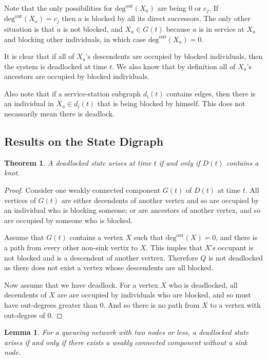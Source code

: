 \documentclass{article}
\newtheorem{theorem}{Theorem}
\newtheorem{lemma}{Lemma}
\begin{document}
Note that the only possibilities for $\text{deg}^{\text{out}}(X_a)$ are being 0 or $c_j$.
If $\text{deg}^{\text{out}}(X_a) = c_j$ then $a$ is blocked by all its direct successors.
The only other situation is that $a$ is not blocked, and $X_a \in G(t)$ because $a$ is in service at $X_a$ and blocking other individuals, in which case $\text{deg}^{\text{out}}(X_a) = 0$.

It is clear that if all of $X_a$'s descendents are occupied by blocked individuals, then the system is deadlocked at time $t$.
We also know that by definition all of $X_a$'s ancestors are occupied by blocked individuals.

Also note that if a service-station subgraph $d_i(t)$ contains edges, then there is an individual in $X_a \in d_i(t)$ that is being blocked by himself.
This does not necassarily mean there is deadlock.


\subsection{Results on the State Digraph}

\begin{theorem}
A deadlocked state arises at time $t$ if and only if $D(t)$ contains a knot.
\end{theorem}

\begin{proof}
Consider one weakly connected component $G(t)$ of $D(t)$ at time $t$.
All vertices of $G(t)$ are either decendents of another vertex and so are occupied by an individual who is blocking someone; or are ancestors of another vertex, and so are occupied by someone who is blocked.

Assume that $G(t)$ contains a vertex $X$ such that $\text{deg}^{\text{out}}(X) = 0$, and there is a path from every other non-sink vertix to $X$.
This imples that $X$'s occupant is not blocked and is a descendent of another vertrex.
Therefore $Q$ is not deadlocked as there does not exist a vertex whose descendents are all blocked.

Now assume that we have deadlock.
For a vertex $X$ who is deadlocked, all decendents of $X$ are are occupied by individuals who are blocked, and so must have out-degrees greater than 0.
And so there is no path from $X$ to a vertex with out-degree of 0.
\end{proof}


\begin{lemma}
For a queueing network with two nodes or less, a deadlocked state arises if and only if there exists a weakly connected component without a sink node.
\end{lemma}
\end{document}
